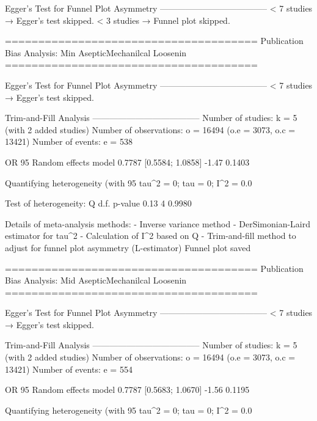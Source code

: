 Egger's Test for Funnel Plot Asymmetry
--------------------------------------
  < 7 studies → Egger’s test skipped.
  < 3 studies → Funnel plot skipped.

======================================
Publication Bias Analysis: Min AsepticMechanilcal Loosenin 
======================================
                                                                                                                                                          
Egger's Test for Funnel Plot Asymmetry
--------------------------------------
  < 7 studies → Egger’s test skipped.

Trim-and-Fill Analysis
--------------------------------------
Number of studies: k = 5 (with 2 added studies)
Number of observations: o = 16494 (o.e = 3073, o.c = 13421)
Number of events: e = 538

                         OR           95%
Random effects model 0.7787 [0.5584; 1.0858] -1.47  0.1403

Quantifying heterogeneity (with 95%
 tau^2 = 0; tau = 0; I^2 = 0.0%

Test of heterogeneity:
    Q d.f. p-value
 0.13    4  0.9980

Details of meta-analysis methods:
- Inverse variance method
- DerSimonian-Laird estimator for tau^2
- Calculation of I^2 based on Q
- Trim-and-fill method to adjust for funnel plot asymmetry (L-estimator)
  Funnel plot saved

======================================
Publication Bias Analysis: Mid AsepticMechanilcal Loosenin 
======================================
                                                                                                                                                          
Egger's Test for Funnel Plot Asymmetry
--------------------------------------
  < 7 studies → Egger’s test skipped.

Trim-and-Fill Analysis
--------------------------------------
Number of studies: k = 5 (with 2 added studies)
Number of observations: o = 16494 (o.e = 3073, o.c = 13421)
Number of events: e = 554

                         OR           95%
Random effects model 0.7787 [0.5683; 1.0670] -1.56  0.1195

Quantifying heterogeneity (with 95%
 tau^2 = 0; tau = 0; I^2 = 0.0%

